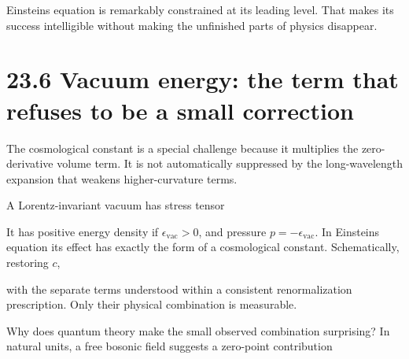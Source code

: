 \documentclass[
  11pt,
  letterpaper,
  oneside,
  openany]{scrbook}
\begin{document}
Einstein\textquotesingle s equation is remarkably constrained at its
leading level. That makes its success intelligible without making the
unfinished parts of physics disappear.

\hypertarget{vacuum-energy-the-term-that-refuses-to-be-a-small-correction}{%
\section{23.6 Vacuum energy: the term that refuses to be a small
correction}\label{vacuum-energy-the-term-that-refuses-to-be-a-small-correction}}

The cosmological constant is a special challenge because it multiplies
the zero-derivative volume term. It is not automatically suppressed by
the long-wavelength expansion that weakens higher-curvature terms.

A Lorentz-invariant vacuum has stress tensor

\begin{center}
\begingroup
{}
\ifdim\wd\grmathbox>\linewidth
\resizebox{\linewidth}{!}{\usebox{\grmathbox}}
\else\usebox{\grmathbox}\fi
\endgroup
\end{center}

It has positive energy density if \(\epsilon_{\mathrm{vac}}>0\), and
pressure \(p=-\epsilon_{\mathrm{vac}}\). In Einstein\textquotesingle s
equation its effect has exactly the form of a cosmological constant.
Schematically, restoring \(c\),

\begin{center}
\begingroup
{}
\ifdim\wd\grmathbox>\linewidth
\resizebox{\linewidth}{!}{\usebox{\grmathbox}}
\else\usebox{\grmathbox}\fi
\endgroup
\end{center}

with the separate terms understood within a consistent renormalization
prescription. Only their physical combination is measurable.

Why does quantum theory make the small observed combination surprising?
In natural units, a free bosonic field suggests a zero-point
contribution

\begin{center}
\begingroup
{}
\ifdim\wd\grmathbox>\linewidth
\resizebox{\linewidth}{!}{\usebox{\grmathbox}}
\else\usebox{\grmathbox}\fi
\endgroup
\end{center}
\end{document}
